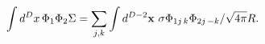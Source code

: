 \begin{equation}
 \int d^Dx\, \Phi_1\Phi_2\Sigma= \sum_{j,k}
     \int d^{D-2}{\bf x}\,\,\sigma\Phi_{1j\,k}\Phi_{2j\,-k}/\sqrt{4\pi}R.
\end{equation}

